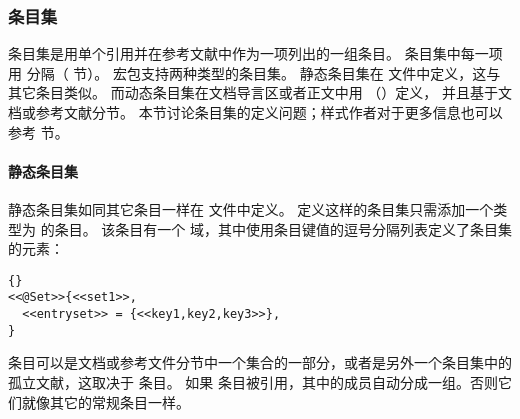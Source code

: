 \subsubsection{条目集}%
\label{use:use:set}


条目集是用单个引用并在参考文献中作为一项列出的一组条目。
条目集中每一项用  分隔（ 节）。
\biblatex 宏包支持两种类型的条目集。
静态条目集在  文件中定义，这与其它条目类似。
而动态条目集在文档导言区或者正文中用  （）定义，
并且基于文档或参考文献分节。
本节讨论条目集的定义问题；样式作者对于更多信息也可以参考  节。

\paragraph{静态条目集}%


静态条目集如同其它条目一样在  文件中定义。
定义这样的条目集只需添加一个类型为  的条目。
该条目有一个  域，其中使用条目键值的逗号分隔列表定义了条目集的元素：

\begin{lstlisting}[style=bibtex]{}
<<@Set>>{<<set1>>,
  <<entryset>> = {<<key1,key2,key3>>},
}
\end{lstlisting}
%
条目可以是文档或参考文件分节中一个集合的一部分，或者是另外一个条目集中的孤立文献，这取决于  条目。
如果  条目被引用，其中的成员自动分成一组。否则它们就像其它的常规条目一样。

